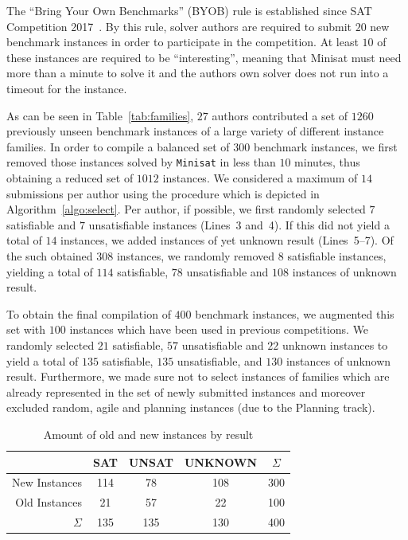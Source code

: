 \documentclass{elsarticle}
\newcommand{\solver}[1]{\texttt{#1}}
\begin{document}
The ``Bring Your Own Benchmarks'' (BYOB) rule is established since SAT Competition 2017~\cite{SC2017}. 
By this rule, solver authors are required to submit $20$ new benchmark instances in order to participate in the competition. At least $10$ of these instances are required to be ``interesting'', meaning that Minisat must need more than a minute to solve it and the authors own solver does not run into a timeout for the instance. 

As can be seen in Table~\ref{tab:families}, $27$ authors contributed a set of $1260$ previously unseen benchmark instances of a large variety of different instance families. 
In order to compile a balanced set of $300$ benchmark instances, we first removed those instances solved by \solver{Minisat} in less than $10$ minutes, thus obtaining a reduced set of $1012$ instances. 
We considered a maximum of $14$ submissions per author using the procedure which is depicted in Algorithm~\ref{algo:select}. 
Per author, if possible, we first randomly selected $7$ satisfiable and $7$ unsatisfiable instances (Lines~3 and~4). 
If this did not yield a total of $14$ instances, we added instances of yet unknown result (Lines~5--7). 
Of the such obtained $308$ instances, we randomly removed $8$ satisfiable instances, yielding a total of $114$ satisfiable, $78$ unsatisfiable and $108$ instances of unknown result. 

To obtain the final compilation of $400$ benchmark instances, we augmented this set with $100$ instances which have been used in previous competitions. 
We randomly selected $21$ satisfiable, $57$ unsatisfiable and $22$ unknown instances to yield a total of $135$ satisfiable, $135$ unsatisfiable, and $130$ instances of unknown result. 
Furthermore, we made sure not to select instances of families which are already represented in the set of newly submitted instances and moreover excluded random, agile and planning instances (due to the Planning track). 

\begin{table}[t]
\centering\small
\begin{tabular}{rcccc}
 & SAT & UNSAT & UNKNOWN & $\Sigma$\\
\hline\arrayrulecolor{lightgray}
New Instances & 114 & 78 & 108 & 300 \\
Old Instances & 21 & 57 & 22 & 100\\
\hline
$\Sigma$ & 135 & 135 & 130 & 400
\end{tabular}
\caption{Amount of old and new instances by result}
\label{tab:final}
\end{table}
\end{document}
